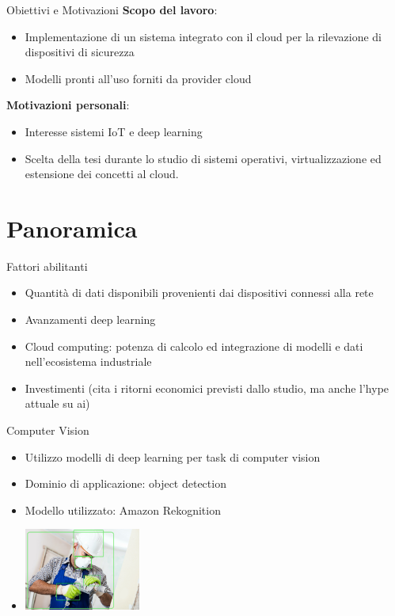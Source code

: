 \documentclass{beamer}
\begin{document}
\begin{frame}{Obiettivi e Motivazioni}
\textbf{Scopo del lavoro}:
\begin{itemize}
	\item Implementazione di un sistema integrato con il cloud per la rilevazione di dispositivi di sicurezza    
    \item Modelli pronti all'uso forniti da provider cloud
    
\end{itemize}

\textbf{Motivazioni personali}:
\begin{itemize}
    \item Interesse sistemi IoT e deep learning
    \item Scelta della tesi durante lo studio di sistemi operativi, virtualizzazione ed estensione dei concetti al cloud.
\end{itemize}
\end{frame}







\section{Panoramica}

\begin{frame}{Fattori abilitanti}
\begin{itemize}
	\item Quantità di dati disponibili provenienti dai dispositivi connessi alla rete
	\item Avanzamenti deep learning
	\item Cloud computing: potenza di calcolo ed integrazione di modelli e dati nell'ecosistema industriale
	\item Investimenti (cita i ritorni economici previsti dallo studio, ma anche l'hype attuale su ai)
\end{itemize}
\end{frame}

\begin{frame}{Computer Vision}
	\begin{itemize}
	\item Utilizzo modelli di deep learning per task di computer vision
	\item Dominio di applicazione: object detection
	\item Modello utilizzato: Amazon Rekognition %
	\item[] %
    \includegraphics[width=0.3\textwidth]{images/worker-with-bb.png}
	\end{itemize}
\end{frame}
\end{document}
